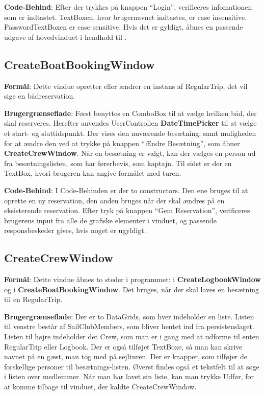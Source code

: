 \textbf{Code-Behind}: 
Efter der trykkes på knappen ``Login'', verificeres infomationen som er indtastet.
TextBoxen, hvor brugernavnet indtastes, er case insensitive.
PasswordTextBoxen er case sensitive.
Hvis det er gyldigt, åbnes en passende udgave af hovedvinduet i hendhold til .

\subsection{CreateBoatBookingWindow}
\textbf{Formål}: 
Dette vindue opretter eller ændrer en instans af RegularTrip, det vil sige en bådreservation. 

\textbf{Brugergrænseflade}: 
Først benyttes en ComboBox til at vælge hvilken båd, der skal reserveres.
Herefter anvendes UserControllen \textbf{DateTimePicker} til at vælge et start- og sluttidspunkt.
Der vises den nuværende besætning, samt muligheden for at ændre den ved at trykke på knappen ``Ændre Besætning'', som åbner \textbf{CreateCrewWindow}.
Når en besætning er valgt, kan der vælges en person ud fra besætningslisten, som har førerbevis, som kaptajn.
Til sidst er der en TextBox, hvori brugeren kan angive formålet med turen.

\textbf{Code-Behind}: 
I Code-Behinden er der to constructors. 
Den ene bruges til at oprette en ny reservation, den anden bruges når der skal ændres på en eksisterende reservation. 
Efter tryk på knappen ``Gem Reservation'', verificeres brugerens input fra alle de grafiske elementer i vinduet, og passende responsbeskeder gives, hvis noget er ugyldigt.

\subsection{CreateCrewWindow}

\textbf{Formål}: Dette vindue åbnes to steder i programmet: i \textbf{CreateLogbookWindow} og i \textbf{CreateBoatBookingWindow}. 
Det bruges, når der skal laves en besætning til en RegularTrip.  

\textbf{Brugergrænseflade}: 
Der er to DataGrids, som hver indeholder en liste. 
Listen til venstre består af SailClubMembers, som bliver hentet ind fra persistenslaget.
Listen til højre indeholder det Crew, som man er i gang med at udforme til enten RegularTrip eller Logbook. 
Der er også tilføjet TextBoxe, så man kan skrive navnet på en gæst, man tog med på sejlturen. 
Der er knapper, som tilføjer de forskellige personer til besætnings-listen. 
Øverst findes også et tekstfelt til at søge i listen over medlemmer. 
Når man har lavet sin liste, kan man trykke Udfør, for at komme tilbage til vinduet, der kaldte CreateCrewWindow.

